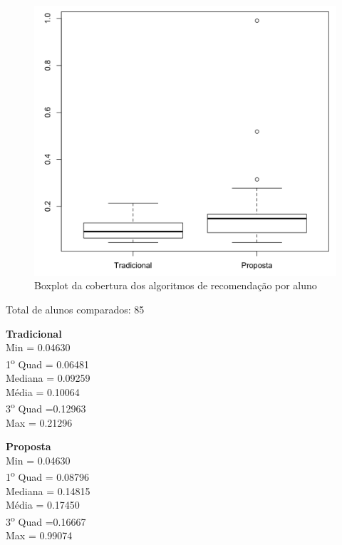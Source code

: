 \begin{figure}[htb]
  \caption{\label{fig:coverage-boxplot}Boxplot da cobertura dos algoritmos de recomendação por aluno}
  \begin{center}
      \includegraphics[scale=0.4]{./Figuras/coverage-boxplot.png}
  \end{center}
\end{figure}

\noindent
Total de alunos comparados: 85

\begin{multicols}{2}

\noindent\textbf{Tradicional}\\
Min = 0.04630\\
1\textsuperscript{o} Quad = 0.06481\\
Mediana = 0.09259\\
Média = 0.10064\\
3\textsuperscript{o} Quad =0.12963\\
Max = 0.21296\\

\columnbreak

\noindent\textbf{Proposta}\\
Min = 0.04630\\
1\textsuperscript{o} Quad = 0.08796\\
Mediana = 0.14815\\
Média = 0.17450\\
3\textsuperscript{o} Quad =0.16667\\
Max = 0.99074
\end{multicols}

